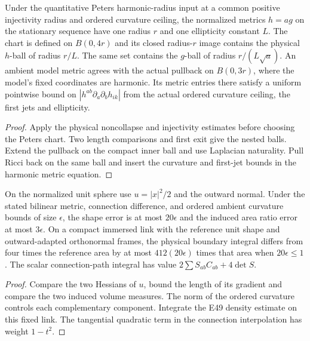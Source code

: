 \begin{proposition}
\label{prop:ed50-chart}
\leanok
Under the quantitative Peters harmonic-radius input at a common positive
injectivity radius and ordered curvature ceiling, the normalized metrics
$h=ag$ on the stationary sequence have one radius $r$ and one ellipticity
constant $L$. The chart is defined on $B(0,4r)$ and its closed radius-$r$
image contains the physical $h$-ball of radius $r/L$. The same set
contains the $g$-ball of radius $r/(L\sqrt a)$. An ambient model metric
agrees with the actual pullback on $B(0,3r)$, where the model's fixed
coordinates are harmonic. Its metric entries there satisfy a uniform
pointwise bound on $|h^{ab}\partial_a\partial_b h_{ik}|$ from the actual
ordered curvature ceiling, the first jets and ellipticity.
\end{proposition}
\begin{proof}
\leanok
Apply the physical noncollapse and injectivity estimates before choosing the
Peters chart. Two length comparisons and first exit give the nested balls.
Extend the pullback on the compact inner ball and use Laplacian naturality.
Pull Ricci back on the same ball and insert the curvature and first-jet
bounds in the harmonic metric equation.
\end{proof}

\begin{proposition}
\label{prop:ed50-link}
\leanok
On the normalized unit sphere use $u=|x|^2/2$ and the outward normal.
Under the stated bilinear metric, connection difference, and ordered
ambient curvature bounds of size $\epsilon$, the shape error is at most
$20\epsilon$ and the induced area ratio error at most $3\epsilon$.
On a compact immersed link with the reference unit shape and
outward-adapted orthonormal frames, the physical boundary integral differs
from four times the reference area by at most
$412(20\epsilon)$ times that area when $20\epsilon\le1$.
The scalar connection-path integral has value
$2\sum S_{ab}C_{ab}+4\det S$.
\end{proposition}
\begin{proof}
\leanok
Compare the two Hessians of $u$, bound the length of its gradient and
compare the two induced volume measures. The norm of the ordered curvature
controls each complementary component. Integrate the E49 density estimate
on this fixed link. The tangential quadratic term in the connection
interpolation has weight $1-t^2$.
\end{proof}

